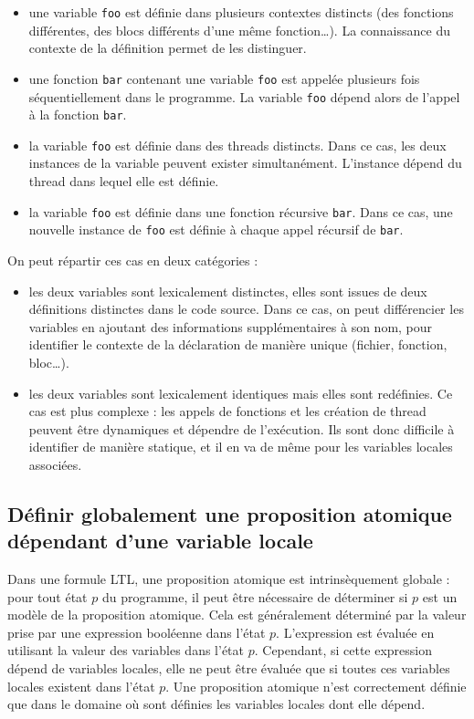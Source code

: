 \begin{itemize}
\item
  une variable \texttt{foo} est définie dans plusieurs contextes
  distincts (des fonctions différentes, des blocs différents d'une même
  fonction\ldots{}). La connaissance du contexte de la définition permet
  de les distinguer.
\item
  une fonction \texttt{bar} contenant une variable \texttt{foo}
  est appelée plusieurs fois séquentiellement dans le programme. La
  variable \texttt{foo} dépend alors de l'appel à la fonction
  \texttt{bar}.
\item
  la variable \texttt{foo} est définie dans des threads distincts.
  Dans ce cas, les deux instances de la variable peuvent exister
  simultanément. L'instance dépend du thread dans lequel elle est
  définie.
\item
  la variable \texttt{foo} est définie dans une fonction récursive
  \texttt{bar}. Dans ce cas, une nouvelle instance de \texttt{foo}
  est définie à chaque appel récursif de \texttt{bar}.
\end{itemize}

On peut répartir ces cas en deux catégories :

\begin{itemize}
\item
  les deux variables sont lexicalement distinctes, elles sont issues de
  deux définitions distinctes dans le code source. Dans ce cas, on peut
  différencier les variables en ajoutant des informations
  supplémentaires à son nom, pour identifier le contexte de la
  déclaration de manière unique (fichier, fonction, bloc\ldots{}).
\item
  les deux variables sont lexicalement identiques mais elles sont
  redéfinies. Ce cas est plus complexe : les appels de fonctions et les
  création de thread peuvent être dynamiques et dépendre de l'exécution.
  Ils sont donc difficile à identifier de manière statique, et il en va
  de même pour les variables locales associées.
\end{itemize}

\subsection{Définir globalement une proposition atomique dépendant
d'une variable locale}

Dans une formule LTL, une proposition atomique est intrinsèquement
globale : pour tout état \(p\) du programme, il peut être nécessaire de
déterminer si \(p\) est un modèle de la proposition atomique. Cela est
généralement déterminé par la valeur prise par une expression booléenne
dans l'état \(p\). L'expression est évaluée en utilisant la valeur des
variables dans l'état \(p\). Cependant, si cette expression dépend de
variables locales, elle ne peut être évaluée que si toutes ces variables
locales existent dans l'état \(p\). Une proposition atomique n'est
correctement définie que dans le domaine où sont définies les variables
locales dont elle dépend.

